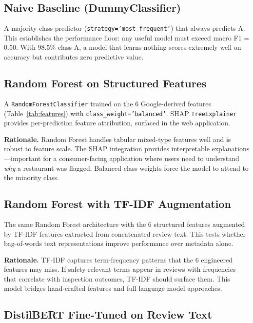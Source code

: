 \documentclass{article}
\begin{document}
\subsection{Naive Baseline (DummyClassifier)}

A majority-class predictor (\texttt{strategy='most\_frequent'}) that always predicts A. This establishes the performance floor: any useful model must exceed macro F1 = 0.50. With 98.5\% class A, a model that learns nothing scores extremely well on accuracy but contributes zero predictive value.

\subsection{Random Forest on Structured Features}

A \texttt{RandomForestClassifier} trained on the 6 Google-derived features (Table~\ref{tab:features}) with \texttt{class\_weight='balanced'}. SHAP \texttt{TreeExplainer} provides per-prediction feature attribution, surfaced in the web application.

\textbf{Rationale.} Random Forest handles tabular mixed-type features well and is robust to feature scale. The SHAP integration provides interpretable explanations---important for a consumer-facing application where users need to understand \textit{why} a restaurant was flagged. Balanced class weights force the model to attend to the minority class.

\subsection{Random Forest with TF-IDF Augmentation}

The same Random Forest architecture with the 6 structured features augmented by TF-IDF features extracted from concatenated review text. This tests whether bag-of-words text representations improve performance over metadata alone.

\textbf{Rationale.} TF-IDF captures term-frequency patterns that the 6 engineered features may miss. If safety-relevant terms appear in reviews with frequencies that correlate with inspection outcomes, TF-IDF should surface them. This model bridges hand-crafted features and full language model approaches.

\subsection{DistilBERT Fine-Tuned on Review Text}
\end{document}
